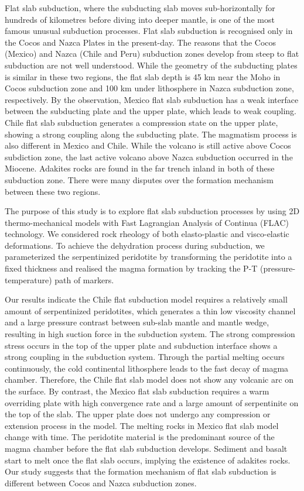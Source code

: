 \begin{abstract*}

Flat slab subduction, where the subducting slab moves sub-horizontally for hundreds of kilometres before diving into deeper mantle, is one of the most famous unusual subduction processes.
Flat slab subduction is recognised only in the Cocos and Nazca Plates in the present-day.
The reasons that the Cocos (Mexico) and Nazca (Chile and Peru) subduction zones develop from steep to flat subduction are not well understood.
While the geometry of the subducting plates is similar in these two regions, the flat slab depth is 45 km near the Moho in Cocos subduction zone and 100 km under lithosphere in Nazca subduction zone, respectively.
By the observation, Mexico flat slab subduction has a weak interface between the subducting plate and the upper plate, which leads to weak coupling.
Chile flat slab subduction generates a compression state on the upper plate, showing a strong coupling along the subducting plate.
The magmatism process is also different in Mexico and Chile.
While the volcano is still active above Cocos subdiction zone, the last active volcano above Nazca subduction occurred in the Miocene.
Adakites rocks are found in the far trench inland in both of these subduction zone.
There were many disputes over the formation mechanism between these two regions.

The purpose of this study is to explore flat slab subduction processes by using 2D thermo-mechanical models with Fast Lagrangian Analysis of Continua (FLAC) technology. 
We considered rock rheology of both elasto-plastic and visco-elastic deformations. 
To achieve the dehydration process during subduction, we parameterized the serpentinized peridotite by transforming the peridotite into a fixed thickness and realised the magma formation by tracking the P-T (pressure-temperature) path of markers.

Our results indicate the Chile flat subduction model requires a relatively small amount of serpentinized peridotites, which generates a thin low viscosity channel and a large pressure contrast between sub-slab mantle and mantle wedge, resulting in high suction force in the subduction system. 
The strong compression stress occurs in the top of the upper plate and subduction interface shows a strong coupling in the subduction system. 
Through the partial melting occurs continuously, the cold continental lithosphere leads to the fast decay of magma chamber. 
Therefore, the Chile flat slab model does not show any volcanic arc on the surface. 
By contrast, the Mexico flat slab subduction requires a warm overriding plate with high convergence rate and a large amount of serpentinite on the top of the slab. 
The upper plate does not undergo any compression or extension process in the model. 
The melting rocks in Mexico flat slab model change with time. 
The peridotite material is the predominant source of the magma chamber before the flat slab subduction develops.
Sediment and basalt start to melt once the flat slab occurs, implying the existence of adakites rocks. 
Our study suggests that the formation mechanism of flat slab subduction is different between Cocos and Nazca subduction zones.
    
\end{abstract*}